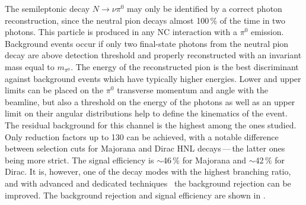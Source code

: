 The semileptonic decay $N \to \nu \pi^0$ may only be identified by a correct photon reconstruction, %
since the neutral pion decays almost 100\,\% of the time in two photons.
This particle is produced in any NC interaction with a $\pi^0$ emission.
Background events occur if only two final-state photons from the neutral pion decay %
are above detection threshold and properly reconstructed with an invariant mass equal to $m_{\pi^0}$.
The energy of the reconstructed pion is the best discriminant against background events %
which have typically higher energies.
Lower and upper limits can be placed on the $\pi^0$ transverse momentum and angle with the beamline, %
but also a threshold on the energy of the photons as well as an upper limit on their angular distributions %
help to define the kinematics of the event.
The residual background for this channel is the highest among the ones studied.
Only reduction factors up to 130 can be achieved, with a notable difference between selection cuts %
for Majorana and Dirac HNL decays\,---\,the latter ones being more strict.
The signal efficiency is $\sim$46\,\% for Majorana and $\sim$42\,\% for Dirac.
It is, however, one of the decay modes with the highest branching ratio, %
and with advanced and dedicated techniques~\cite{Ankowski:2008aa, Back:2012wc}
the background rejection can be improved.
The background rejection and signal efficiency are shown in .



